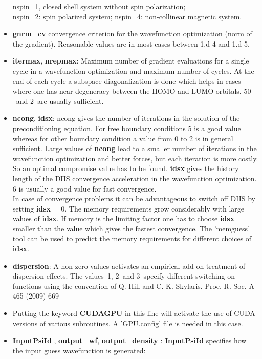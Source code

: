 \documentclass[a4paper,11pt]{report}
\begin{document}
\begin{itemize}
      nspin=1, closed shell system without spin polarization;\hfill\\
      nspin=2: spin polarized system; 
      nspin=4: non-collinear magnetic system.
\item {\bf gnrm\_cv} convergence criterion for the wavefunction optimization (norm of the gradient).
      Reasonable values are in most cases between 1.d-4 and 1.d-5.
\item {\bf itermax}, {\bf nrepmax}: Maximum number of gradient evaluations for a single cycle in a wavefunction optimization 
      and maximum number of cycles. At the end of each cycle a subspace diagonalization is done which helps 
in cases where one has near degeneracy between the HOMO and LUMO orbitals. $50$~and $2$~are usually sufficient.
\item {\bf ncong}, {\bf idsx}: ncong gives the number of iterations in the solution of the preconditioning equation.
      For free boundary conditions $5$ is a good value whereas for other  boundary condition a value from 0 to 2 is in general sufficient. 
      Large values of {\bf ncong} lead to a smaller number of iterations in 
      the wavefunction optimization and better forces, but each iteration is more costly. 
      So an optimal compromise value has to be found.
      {\bf idsx} gives the history length of the DIIS convergence acceleration in the wavefunction optimization.
      6 is usually a good value for fast convergence.\\
      In case of convergence problems it can be advantageous 
      to switch off DIIS by setting {\bf idsx} = 0. The memory requirements grow considerably with large values of 
      {\bf idsx}. If memory is the limiting factor one has to choose {\bf idsx} smaller than the value which gives 
      the fastest convergence. The 'memguess' tool can be used to predict the memory requirements for different choices 
      of  {\bf idsx}.
\item {\bf dispersion}:  A non-zero values activates an  empirical add-on treatment of dispersion effects.
      The values~1, 2~and 3~specify different switching on functions using the convention of 
      Q. Hill and C.-K. Skylaris.  Proc. R. Soc. A 465  (2009) 669
\item Putting the keyword \textbf{CUDAGPU} in this line will activate the use of CUDA versions of various subroutines.
      A 'GPU.config' file is needed in this case. 
\item {\bf InputPsiId }, {\bf  output\_wf},  {\bf output\_density }: 
      {\bf InputPsiId } specifies how the input guess wavefunction is generated:

\end{itemize}
\end{document}
